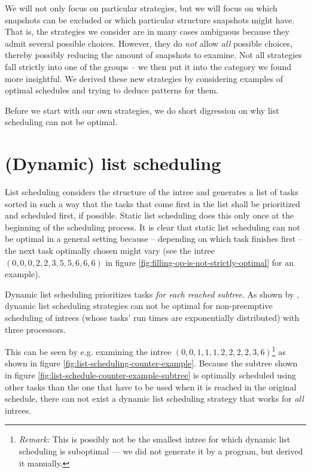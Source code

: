We will not only focus on particular strategies, but we will focus on which snapshots can be excluded or which particular structure snapshots might have. That is, the strategies we consider are in many cases ambiguous because they admit several possible choices. However, they do \emph{not} allow \emph{all} possible choices, thereby possibly reducing the amount of snapshots to examine. Not all strategies fall strictly into one of the groups -- we then put it into the category we found more insightful. We derived these new strategies by considering examples of optimal schedules and trying to deduce patterns for them.

Before we start with our own strategies, we do short digression on why list scheduling can not be optimal.

\section{(Dynamic) list scheduling}
\label{sec:suboptimal-strategies-list-scheduling}

List scheduling considers the structure of the intree and generates a list of tasks sorted in such a way that the tasks that come first in the list shall be prioritized and scheduled first, if possible. Static list scheduling does this only once at the beginning of the scheduling process. It is clear that static list scheduling can not be optimal in a general setting because -- depending on which task finishes first -- the next task optimally chosen might vary (see the intree $(0,0,0,2,2,3,5,5,6,6,6)$ in figure \ref{fig:filling-op-is-not-strictly-optimal} for an example).

Dynamic list scheduling prioritizes tasks \emph{for each reached subtree}. As shown by \cite{MoritzMaasDiploma}, dynamic list scheduling strategies can not be optimal for non-preemptive scheduling of intrees (whose tasks' run times are exponentially distributed) with three processors.

This can be seen by e.g. examining the intree $(0,0,1,1,1,2,2,2,2,3,6)$\footnote{\emph{Remark:} This is possibly not be the smallest intree for which dynamic list scheduling is suboptimal --- we did not generate it by a program, but derived it manually.} as shown in figure \ref{fig:list-scheduling-counter-example}. Because the subtree shown in figure \ref{fig:list-schedule-counter-example-subtree} is optimally scheduled using other tasks than the one that have to be used when it is reached in the original schedule, there can not exist a dynamic list scheduling strategy that works for \emph{all} intrees.

